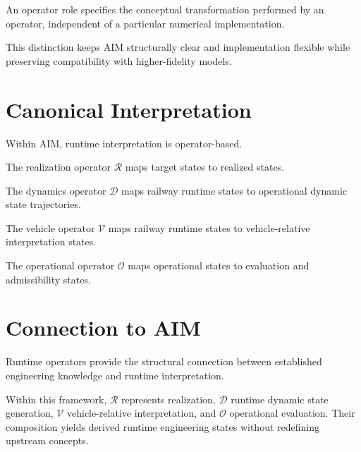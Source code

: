 \begin{definition}
\label{def:runtime-operator-role}
An operator role specifies the conceptual transformation performed by an
operator, independent of a particular numerical implementation.
\end{definition}

This distinction keeps AIM structurally clear and implementation
flexible while preserving compatibility with higher-fidelity models.

\section{Canonical Interpretation}

\begin{proposition}
Within AIM, runtime interpretation is operator-based.
\end{proposition}

\begin{proposition}
The realization operator \(\mathcal R\) maps target states to realized
states.
\end{proposition}

\begin{proposition}
The dynamics operator \(\mathcal D\) maps railway runtime states to
operational dynamic state trajectories.
\end{proposition}

\begin{proposition}
The vehicle operator \(\mathcal V\) maps railway runtime states to
vehicle-relative interpretation states.
\end{proposition}

\begin{proposition}
The operational operator \(\mathcal O\) maps operational states to
evaluation and admissibility states.
\end{proposition}

\section{Connection to AIM}

\begin{summary}
Runtime operators provide the structural connection between established
engineering knowledge and runtime interpretation.

Within this framework, \(\mathcal R\) represents realization,
\(\mathcal D\) runtime dynamic state generation, \(\mathcal V\)
vehicle-relative interpretation, and \(\mathcal O\) operational
evaluation. Their composition yields derived runtime engineering states
without redefining upstream concepts.
\end{summary}
